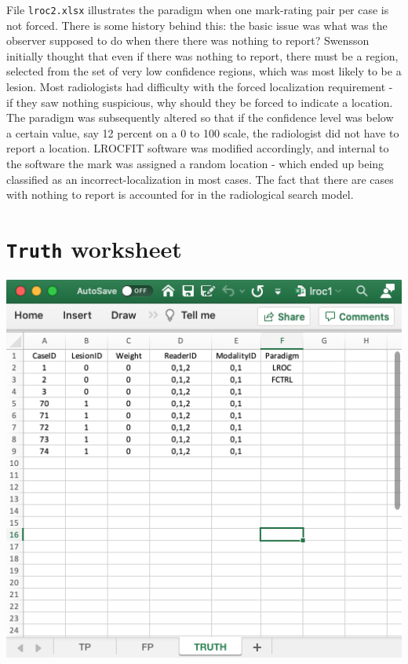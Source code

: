 \documentclass[
]{book}
\begin{document}
File \texttt{lroc2.xlsx} illustrates the paradigm when one mark-rating pair per case is not forced. There is some history behind this: the basic issue was what was the observer supposed to do when there there was nothing to report? Swensson initially thought that even if there was nothing to report, there must be a region, selected from the set of very low confidence regions, which was most likely to be a lesion. Most radiologists had difficulty with the forced localization requirement - if they saw nothing suspicious, why should they be forced to indicate a location. The paradigm was subsequently altered so that if the confidence level was below a certain value, say 12 percent on a 0 to 100 scale, the radiologist did not have to report a location. LROCFIT software was modified accordingly, and internal to the software the mark was assigned a random location - which ended up being classified as an incorrect-localization in most cases. The fact that there are cases with nothing to report is accounted for in the radiological search model.

\hypertarget{quick-start-lroc-truth}{%
\section{\texorpdfstring{\texttt{Truth} worksheet}{Truth worksheet}}\label{quick-start-lroc-truth}}

\includegraphics[width=1\textwidth,height=\textheight]{images/quick-start/lroc1Truth.png}
\end{document}
